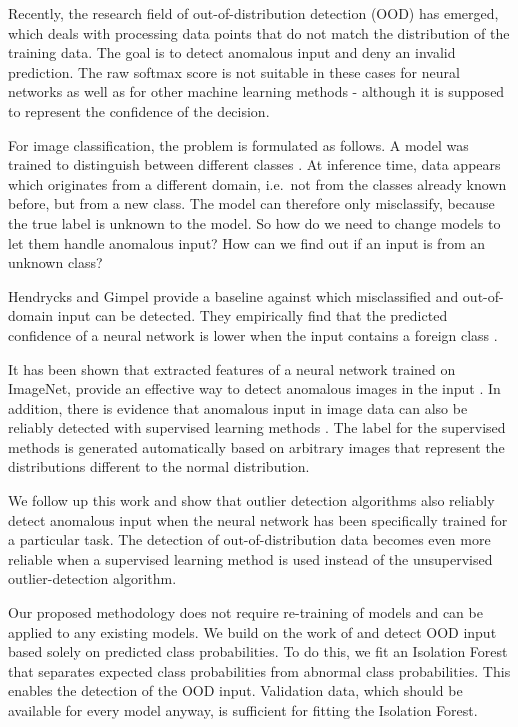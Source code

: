 \documentclass{article}
\begin{document}
Recently, the research field of out-of-distribution detection (OOD) has emerged, which deals with processing data points that do not match the distribution of the training data. The goal is to detect anomalous input and deny an invalid prediction. The raw softmax score is not suitable in these cases for neural networks \cite{ChuanGuo.2017b} as well as for other machine learning methods \cite{NiculescuMizil.2005} - although it is supposed to represent the confidence of the decision.

For image classification, the problem is formulated as follows. A model was trained to distinguish between  different classes . At inference time, data appears which originates from a different domain, i.e.~not from the  classes already known before, but from a new class. The model can therefore only misclassify, because the true label  is unknown to the model. So how do we need to change models to let them handle anomalous input? How can we find out if an input is from an unknown class?

Hendrycks and Gimpel \cite{Hendrycks.2016} provide a baseline against which misclassified and out-of-domain input can be detected. They empirically find that the predicted confidence of a neural network is lower when the input contains a foreign class . 

It has been shown that extracted features of a neural network trained on ImageNet, provide an effective way to detect anomalous images in the input \cite{Bergman.2020}. In addition, there is evidence that anomalous input in image data can also be reliably detected with supervised learning methods \cite{Ruff.30.05.2020, Hendrycks.2018}. The label for the supervised methods is generated automatically based on arbitrary images that represent the distributions different to the normal distribution.

We follow up this work and show that outlier detection algorithms also reliably detect anomalous input when the neural network has been specifically trained for a particular task. The detection of out-of-distribution data becomes even more reliable when a supervised learning method is used instead of the unsupervised outlier-detection algorithm.

Our proposed methodology does not require re-training of models and can be applied to any existing models. We build on the work of \cite{Hendrycks.2016} and detect OOD input based solely on predicted class probabilities. To do this, we fit an Isolation Forest that separates expected class probabilities from abnormal class probabilities. This enables the detection of the OOD input. Validation data, which should be available for every model anyway, is sufficient for fitting the Isolation Forest.
\end{document}
